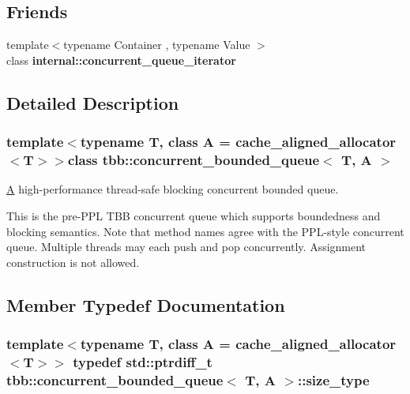 \subsection*{Friends}
\begin{DoxyCompactItemize}
\item 
\hypertarget{classtbb_1_1concurrent__bounded__queue_a1f5eec0de2e660ea5372d19393f0920b}{}{\footnotesize template$<$typename Container , typename Value $>$ }\\class {\bfseries internal\+::concurrent\+\_\+queue\+\_\+iterator}\label{classtbb_1_1concurrent__bounded__queue_a1f5eec0de2e660ea5372d19393f0920b}

\end{DoxyCompactItemize}


\subsection{Detailed Description}
\subsubsection*{template$<$typename T, class A = cache\+\_\+aligned\+\_\+allocator$<$\+T$>$$>$class tbb\+::concurrent\+\_\+bounded\+\_\+queue$<$ T, A $>$}

\hyperlink{structA}{A} high-\/performance thread-\/safe blocking concurrent bounded queue. 

This is the pre-\/\+P\+P\+L T\+B\+B concurrent queue which supports boundedness and blocking semantics. Note that method names agree with the P\+P\+L-\/style concurrent queue. Multiple threads may each push and pop concurrently. Assignment construction is not allowed. 

\subsection{Member Typedef Documentation}
\hypertarget{classtbb_1_1concurrent__bounded__queue_ae73fa352d781bdb9d01bfb77f2a8bc28}{}
\subsubsection[{size\+\_\+type}]{\setlength{\rightskip}{0pt plus 5cm}template$<$typename T, class A = cache\+\_\+aligned\+\_\+allocator$<$\+T$>$$>$ typedef std\+::ptrdiff\+\_\+t {\bf tbb\+::concurrent\+\_\+bounded\+\_\+queue}$<$ T, {\bf A} $>$\+::{\bf size\+\_\+type}}\label{classtbb_1_1concurrent__bounded__queue_ae73fa352d781bdb9d01bfb77f2a8bc28}


